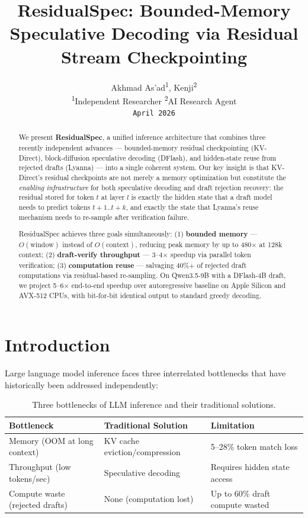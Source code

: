 \documentclass[11pt]{article}
\title{\textbf{ResidualSpec: Bounded-Memory Speculative Decoding via Residual Stream Checkpointing}}
\author{Akhmad As'ad\textsuperscript{1}, Kenji\textsuperscript{2}\\
\textsuperscript{1}Independent Researcher \quad \textsuperscript{2}AI Research Agent\\
\texttt{April 2026}}
\date{}
\begin{document}
\maketitle

\begin{abstract}
We present \textbf{ResidualSpec}, a unified inference architecture that combines three recently independent advances — bounded-memory residual checkpointing (KV-Direct), block-diffusion speculative decoding (DFlash), and hidden-state reuse from rejected drafts (Lyanna) — into a single coherent system. Our key insight is that KV-Direct's residual checkpoints are not merely a memory optimization but constitute the \textit{enabling infrastructure} for both speculative decoding and draft rejection recovery: the residual stored for token $t$ at layer $l$ is exactly the hidden state that a draft model needs to predict tokens $t+1..t+k$, and exactly the state that Lyanna's reuse mechanism needs to re-sample after verification failure.

ResidualSpec achieves three goals simultaneously: (1) \textbf{bounded memory} — $O(\text{window})$ instead of $O(\text{context})$, reducing peak memory by up to 480$\times$ at 128k context; (2) \textbf{draft-verify throughput} — 3--4$\times$ speedup via parallel token verification; (3) \textbf{computation reuse} — salvaging 40\%+ of rejected draft computations via residual-based re-sampling. On Qwen3.5-9B with a DFlash-4B draft, we project 5--6$\times$ end-to-end speedup over autoregressive baseline on Apple Silicon and AVX-512 CPUs, with bit-for-bit identical output to standard greedy decoding.
\end{abstract}

\section{Introduction}

Large language model inference faces three interrelated bottlenecks that have historically been addressed independently:

\begin{table}[h]
\centering
\caption{Three bottlenecks of LLM inference and their traditional solutions.}
\label{tab:bottlenecks}
\begin{tabular}{lll}
\toprule
\textbf{Bottleneck} & \textbf{Traditional Solution} & \textbf{Limitation} \\
\midrule
Memory (OOM at long context) & KV cache eviction/compression & 5--28\% token match loss \\
Throughput (low tokens/sec) & Speculative decoding & Requires hidden state access \\
Compute waste (rejected drafts) & None (computation lost) & Up to 60\% draft compute wasted \\
\bottomrule
\end{tabular}
\end{table}
\end{document}

